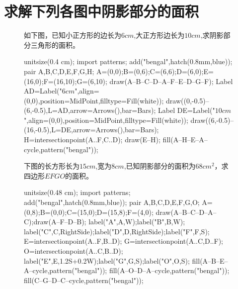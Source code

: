 \documentclass[12pt,space]{ctexart} %
\begin{document}
\section{求解下列各图中阴影部分的面积}
\begin{figure}[ht]
	\centering
	\begin{minipage}[b]{0.45\textwidth}
		如下图，已知小正方形的边长为$6cm$,大正方形边长为$10cm$,求阴影部分三角形的面积。\\
		\begin{asy}
			unitsize(0.4 cm);
			import patterns;
			add("bengal",hatch(0.8mm,blue));
			pair A,B,C,D,E,F,G,H;
			A=(0,0);B=(0,6);C=(6,6);D=(6,0);E=(16,0);F=(16,10);G=(6,10);
			draw(A--B--C--D--A--F--E--D--G--F);
			Label AD=Label("$6cm$",align=(0,0),position=MidPoint,filltype=Fill(white));
			draw((0,-0.5)--(6,-0.5),L=AD,arrow=Arrows(),bar=Bars);
			Label DE=Label("$10cm$",align=(0,0),position=MidPoint,filltype=Fill(white));
			draw((6,-0.5)--(16,-0.5),L=DE,arrow=Arrows(),bar=Bars);
			H=intersectionpoint(A..F,C..D);
			draw(E--H);
			fill(A--H--E--A--cycle,pattern("bengal"));
		\end{asy}
	\end{minipage}
	\qquad
	\begin{minipage}[b]{0.48\textwidth}
    下图的长方形长为$15cm$,宽为$8cm$,已知阴影部分的面积为$68cm^2$，求四边形$EFGO$的面积。\\
		\begin{asy}
			unitsize(0.48 cm);
			import patterns;
			add("bengal",hatch(0.8mm,blue));
      pair A,B,C,D,E,F,G,O;
      A=(0,8);B=(0,0);C=(15,0);D=(15,8);F=(4,0);
      draw(A--B--C--D--A--C);draw(A--F--D--B);
      label("A",A,W);label("B",B,W);
      label("C",C,RightSide);label("D",D,RightSide);label("F",F,S);
      E=intersectionpoint(A..F,B..D);
      G=intersectionpoint(A..C,D..F);
      O=intersectionpoint(A..C,B..D);
      label("E",E,1.2S+0.2W);label("G",G,S);label("O",O,S);
      fill(A--B--E--A--cycle,pattern("bengal"));
      fill(A--O--D--A--cycle,pattern("bengal"));
      fill(C--G--D--C--cycle,pattern("bengal"));
		\end{asy}
	\end{minipage}
\end{figure}
\vspace{1cm}
\end{document}
